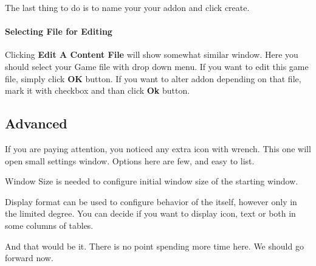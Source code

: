 The last thing to do is to name your your addon and click create.

\paragraph{Selecting File for Editing}
Clicking \textbf{Edit A Content File} will show somewhat similar window. Here you should select your Game file with drop down menu. If you want to edit this game file, simply click \textbf{OK} button. If you want to alter addon depending on that file, mark it with checkbox and than click \textbf{Ok} button.

\subsection{Advanced}
If you are paying attention, you noticed any extra icon with wrench. This one will open small settings window. Options here are few, and easy to list.
\begin{description}
 \item {Window Size} is needed to configure initial window size of the starting window.
 \item {Display format} can be used to configure behavior of the \OCS{} itself, however only in the limited degree. You can decide if you want \OCS{} to display icon, text or both in some columns of tables.
\end{description}

And that would be it. There is no point spending more time here. We should go forward now.